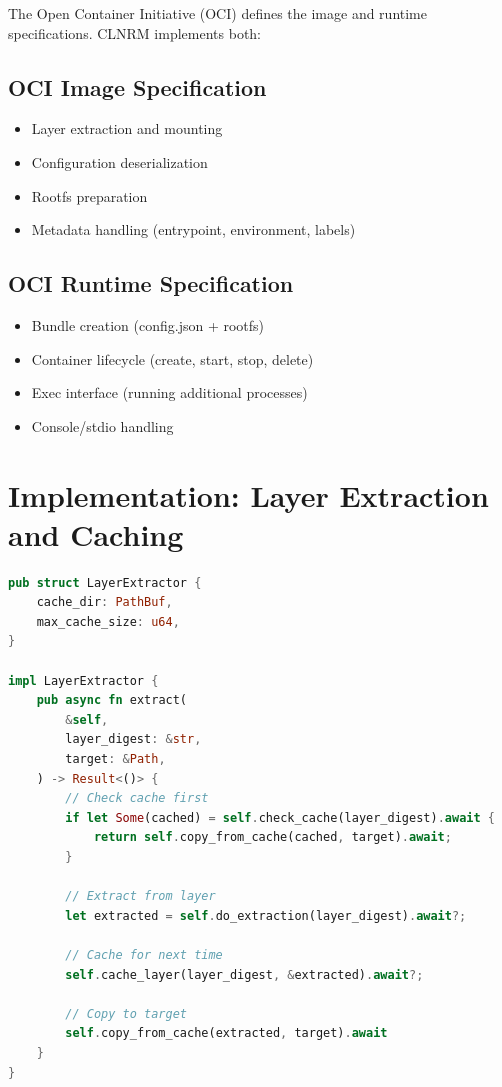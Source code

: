 \documentclass[12pt,twoside,openright]{book}
\theoremstyle{plain}
\theoremstyle{definition}
\theoremstyle{remark}
\begin{document}
The Open Container Initiative (OCI) defines the image and runtime specifications. CLNRM implements both:

\subsection{OCI Image Specification}

\begin{itemize}
  \item Layer extraction and mounting
  \item Configuration deserialization
  \item Rootfs preparation
  \item Metadata handling (entrypoint, environment, labels)
\end{itemize}

\subsection{OCI Runtime Specification}

\begin{itemize}
  \item Bundle creation (config.json + rootfs)
  \item Container lifecycle (create, start, stop, delete)
  \item Exec interface (running additional processes)
  \item Console/stdio handling
\end{itemize}

\section{Implementation: Layer Extraction and Caching}

\begin{lstlisting}[language=Rust, caption=OCI Layer Extraction with Caching]
pub struct LayerExtractor {
    cache_dir: PathBuf,
    max_cache_size: u64,
}

impl LayerExtractor {
    pub async fn extract(
        &self,
        layer_digest: &str,
        target: &Path,
    ) -> Result<()> {
        // Check cache first
        if let Some(cached) = self.check_cache(layer_digest).await {
            return self.copy_from_cache(cached, target).await;
        }

        // Extract from layer
        let extracted = self.do_extraction(layer_digest).await?;

        // Cache for next time
        self.cache_layer(layer_digest, &extracted).await?;

        // Copy to target
        self.copy_from_cache(extracted, target).await
    }
}
\end{lstlisting}
\end{document}
